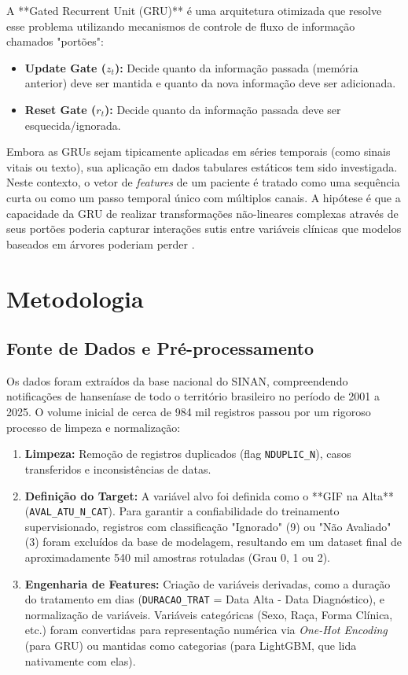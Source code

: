 \documentclass[12pt, a4paper]{report}
\begin{document}
A **Gated Recurrent Unit (GRU)** é uma arquitetura otimizada que resolve esse problema utilizando mecanismos de controle de fluxo de informação chamados "portões":
\begin{itemize}
    \item \textbf{Update Gate ($z_t$):} Decide quanto da informação passada (memória anterior) deve ser mantida e quanto da nova informação deve ser adicionada.
    \item \textbf{Reset Gate ($r_t$):} Decide quanto da informação passada deve ser esquecida/ignorada.
\end{itemize}
Embora as GRUs sejam tipicamente aplicadas em séries temporais (como sinais vitais ou texto), sua aplicação em dados tabulares estáticos tem sido investigada. Neste contexto, o vetor de \textit{features} de um paciente é tratado como uma sequência curta ou como um passo temporal único com múltiplos canais. A hipótese é que a capacidade da GRU de realizar transformações não-lineares complexas através de seus portões poderia capturar interações sutis entre variáveis clínicas que modelos baseados em árvores poderiam perder \citep{cho2014gru, shahidi2024exploring}.

\chapter{Metodologia}

\section{Fonte de Dados e Pré-processamento}
Os dados foram extraídos da base nacional do SINAN, compreendendo notificações de hanseníase de todo o território brasileiro no período de 2001 a 2025. O volume inicial de cerca de 984 mil registros passou por um rigoroso processo de limpeza e normalização:
\begin{enumerate}
    \item \textbf{Limpeza:} Remoção de registros duplicados (flag \texttt{NDUPLIC\_N}), casos transferidos e inconsistências de datas.
    \item \textbf{Definição do Target:} A variável alvo foi definida como o **GIF na Alta** (\texttt{AVAL\_ATU\_N\_CAT}). Para garantir a confiabilidade do treinamento supervisionado, registros com classificação "Ignorado" (9) ou "Não Avaliado" (3) foram excluídos da base de modelagem, resultando em um dataset final de aproximadamente 540 mil amostras rotuladas (Grau 0, 1 ou 2).
    \item \textbf{Engenharia de Features:} Criação de variáveis derivadas, como a duração do tratamento em dias (\texttt{DURACAO\_TRAT} = Data Alta - Data Diagnóstico), e normalização de variáveis. Variáveis categóricas (Sexo, Raça, Forma Clínica, etc.) foram convertidas para representação numérica via \textit{One-Hot Encoding} (para GRU) ou mantidas como categorias (para LightGBM, que lida nativamente com elas).
\end{enumerate}
\end{document}
